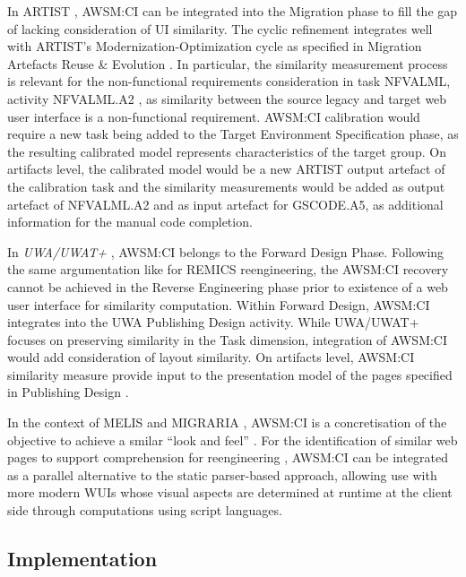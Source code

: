 In ARTIST \autocite{ARTIST2014Methodology}, AWSM:CI can be integrated into the Migration phase to fill the gap of lacking consideration of UI similarity.
The cyclic refinement integrates well with ARTIST's Modernization-Optimization cycle as specified in Migration Artefacts Reuse \& Evolution \autocite{Menychtas2013ARTIST}.
In particular, the similarity measurement process is relevant for the non-functional requirements consideration in task NFVALML, activity NFVALML.A2 \autocite{ARTIST2014Methodology}, as similarity between the source legacy and target web user interface is a non-functional requirement.
AWSM:CI calibration would require a new task being added to the Target Environment Specification phase, as the resulting calibrated model represents characteristics of the target group.
On artifacts level, the calibrated model would be a new ARTIST output artefact of the calibration task and the similarity measurements would be added as output artefact of NFVALML.A2 and as input artefact for GSCODE.A5, as additional information for the manual code completion.

In \emph{UWA/UWAT+} \autocite{Distante2006a,Distante2006CaseStudy}, AWSM:CI belongs to the Forward Design Phase.
Following the same argumentation like for REMICS reengineering, the AWSM:CI recovery cannot be achieved in the Reverse Engineering phase prior to existence of a web user interface for similarity computation.
Within Forward Design, AWSM:CI integrates into the UWA Publishing Design activity.
While UWA/UWAT+ focuses on preserving similarity in the Task dimension, integration of AWSM:CI would add consideration of layout similarity.
On artifacts level, AWSM:CI similarity measure provide input to the presentation model of the pages specified in Publishing Design \autocite{Distante2006CaseStudy}.

In the context of MELIS \autocite{Lucia2008} and MIGRARIA \autocite{Rodriguez-Echeverria2012MIGRARIA}, AWSM:CI is a concretisation of the objective to achieve a smilar ``look and feel'' \autocite{Rodriguez-Echeverria2012MIGRARIA,Lucia2008,Lucia2006}.
For the identification of similar web pages to support comprehension for reengineering \autocite{Lucia2007SimilarPages}, AWSM:CI can be integrated as a parallel alternative to the static parser-based approach, allowing use with more modern WUIs whose visual aspects are determined at runtime at the client side through computations using script languages.

\hypertarget{implementation}{%
\subsection{Implementation}\label{implementation}}

